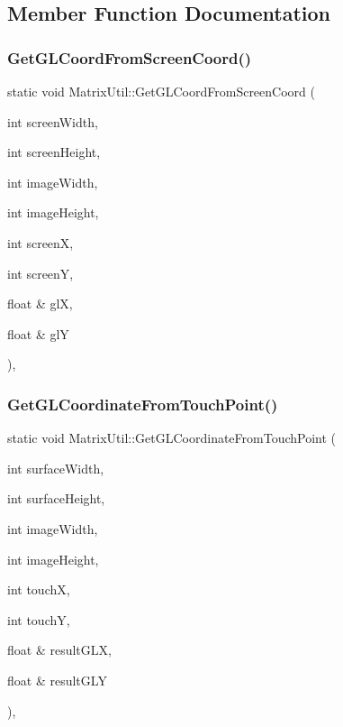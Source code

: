 \subsection{Member Function Documentation}
\mbox{\label{class_matrix_util_a6d00d7dae3bb1c5b685adc3ea191e89e}} 
\subsubsection{\texorpdfstring{Get\+G\+L\+Coord\+From\+Screen\+Coord()}{GetGLCoordFromScreenCoord()}}
{\footnotesize\ttfamily static void Matrix\+Util\+::\+Get\+G\+L\+Coord\+From\+Screen\+Coord (\begin{DoxyParamCaption}\item[{int}]{screen\+Width,  }\item[{int}]{screen\+Height,  }\item[{int}]{image\+Width,  }\item[{int}]{image\+Height,  }\item[{int}]{screenX,  }\item[{int}]{screenY,  }\item[{float \&}]{glX,  }\item[{float \&}]{glY }\end{DoxyParamCaption})\hspace{0.3cm}{\ttfamily [inline]}, {\ttfamily [static]}}

\mbox{\label{class_matrix_util_a2efb998ca1494b7c6c2887eaa4ca268f}} 
\subsubsection{\texorpdfstring{Get\+G\+L\+Coordinate\+From\+Touch\+Point()}{GetGLCoordinateFromTouchPoint()}}
{\footnotesize\ttfamily static void Matrix\+Util\+::\+Get\+G\+L\+Coordinate\+From\+Touch\+Point (\begin{DoxyParamCaption}\item[{int}]{surface\+Width,  }\item[{int}]{surface\+Height,  }\item[{int}]{image\+Width,  }\item[{int}]{image\+Height,  }\item[{int}]{touchX,  }\item[{int}]{touchY,  }\item[{float \&}]{result\+G\+LX,  }\item[{float \&}]{result\+G\+LY }\end{DoxyParamCaption})\hspace{0.3cm}{\ttfamily [inline]}, {\ttfamily [static]}}

